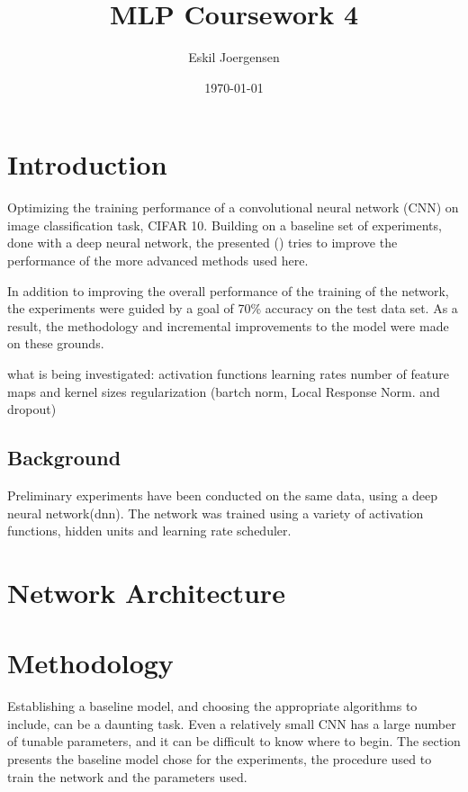 \documentclass[]{article}
\title{MLP Coursework 4}
\author{Eskil Joergensen}
\date{\today}
\begin{document}
\maketitle

\section{Introduction}

Optimizing the training performance of a convolutional neural network (CNN) on image classification task, CIFAR 10. Building on a baseline set of experiments, done with a deep neural network, the presented () tries to improve the performance of the more advanced methods used here. 

In addition to improving the overall performance of the training of the network, the experiments were guided by a goal of 70\% accuracy on the test data set. As a result, the methodology and incremental improvements to the model were made on these grounds. 


what is being investigated:
activation functions
learning rates
number of feature maps and kernel sizes
regularization (bartch norm, Local Response Norm. and dropout)

\subsection{Background}

Preliminary experiments have been conducted on the same data, using a deep neural network(dnn). The network was trained using a variety of activation functions, hidden units and learning rate scheduler. 

\section{Network Architecture}



\section{Methodology}

Establishing a baseline model, and choosing the appropriate algorithms to include, can be a daunting task. Even a relatively small CNN has a large number of tunable parameters, and it can be difficult to know where to begin. The section presents the baseline model chose for the experiments, the procedure used to train the network and the parameters used. 
\end{document}
